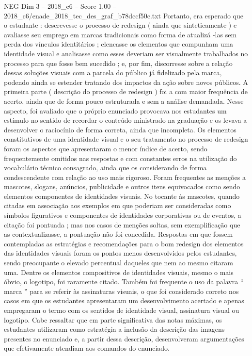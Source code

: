 \begin{textsample}{NEG Dim 3 – 2018\_c6 – Score 1.00 – 2018\_c6/enade\_2018\_tec\_des\_graf\_b78dccf50c.txt}
Portanto, era esperado que o estudante : descrevesse o processo de redesign ( ainda que sinteticamente ) e avaliasse seu emprego em marcas tradicionais como forma de atualizá -las sem perda dos vínculos identitários ; elencasse os elementos que compunham uma identidade visual e analisasse como esses deveriam ser visualmente trabalhados no processo para que fosse bem sucedido ; e, por fim, discorresse sobre a relação dessas soluções visuais com a parcela do público já fidelizado pela marca, podendo ainda se estender tratando dos impactos da ação sobre novos públicos.
A primeira parte ( descrição do processo de redesign ) foi a com maior frequência de acerto, ainda que de forma pouco estruturada e sem a análise demandada.
Nesse aspecto, foi avaliado que o próprio enunciado provocava nos estudantes um estímulo no sentido de recordar o conteúdo ministrado na graduação e os levava a desenvolver o raciocínio de forma correta, ainda que incompleta.
Os elementos constitutivos de uma identidade visual e o seu tratamento no processo de redesign foram os aspectos que apresentaram o menor índice de acerto, sendo frequentemente omitidos nas respostas e com constantes erros na utilização do vocabulário técnico consagrado, ainda que os considerando de forma condescendente com relação ao uso mais rigoroso.
Foram frequentes as menções a mascotes, slogans, anúncios, publicidade e outros itens equivocados como sendo elementos componentes de identidades visuais.
No tocante às mascotes, quando citadas em associação aos exemplos em que poderiam ser consideradas como símbolos figurativos e componentes de identidades corporativas ou de eventos, a citação foi pontuada ; mas nos casos de menções soltas, sem exemplificação que as contextualizasse, a pontuação não foi concedida.
Respostas em que fossem contempladas as estratégias e recomendações para o bom redesign dos elementos das identidades visuais foram os pontos menos desenvolvidos pelos estudantes, sendo preocupante o elevado percentual daqueles que nem ao mesmo citaram uma.
Dentre os elementos compositivos de identidades visuais, mesmo o mais óbvio, o logotipo, foi raramente citado.
Também foi frequente o uso da palavra “ marca ” para se referir às assinaturas visuais, o que foi considerado correto nos casos em que os estudantes apresentaram um desenvolvimento acertado e apenas empregaram o termo com os sentidos de identidade visual, assinatura visual ou logotipo.
Cabe ressaltar que em parte significativa das notas máximas, os estudantes utilizaram como estratégia a inclusão da descrição das imagens presentes no enunciado e, a partir dessa descrição, desenvolveram argumentações que efetivamente atendiam aos comandos do enunciado.

\end{textsample}
